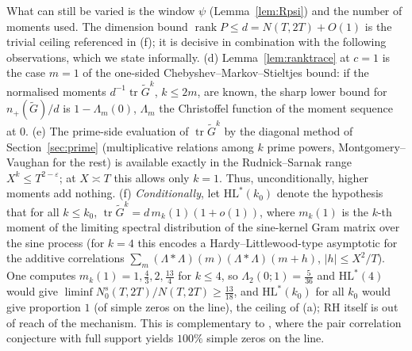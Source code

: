 \documentclass[11pt]{amsart}
\theoremstyle{definition}
\theoremstyle{remark}
\numberwithin{equation}{section}
\DeclareMathOperator{\tr}{tr}
\DeclareMathOperator{\rank}{rank}
\newcommand{\eps}{\varepsilon}
\newcommand{\Gt}{\widetilde{G}}
\newcommand{\npl}{n_{+}}
\begin{document}
What can still be varied is the window $\psi$ (Lemma~\ref{lem:Rpsi}) and the number of moments used. The dimension bound $\rank P\le d=N(T,2T)+O(1)$ is the trivial ceiling referenced in (f); it is decisive in combination with the following observations, which we state informally. (d) Lemma~\ref{lem:ranktrace} at $c=1$ is the case $m=1$ of the one-sided Chebyshev--Markov--Stieltjes bound: if the normalised moments $d^{-1}\tr\Gt^k$, $k\le2m$, are known, the sharp lower bound for $\npl(\Gt)/d$ is $1-\Lambda_m(0)$, $\Lambda_m$ the Christoffel function of the moment sequence at $0$. (e) The prime-side evaluation of $\tr\Gt^k$ by the diagonal method of Section~\ref{sec:prime} (multiplicative relations among $k$ prime powers, Montgomery--Vaughan for the rest) is available exactly in the Rudnick--Sarnak range \cite{RS96} $X^k\le T^{2-\eps}$; at $X\asymp T$ this allows only $k=1$. Thus, unconditionally, higher moments add nothing. (f) \emph{Conditionally}, let $\mathrm{HL}^*(k_0)$ denote the hypothesis that for all $k\le k_0$, $\tr\Gt^k=d\,m_k(1)(1+o(1))$, where $m_k(1)$ is the $k$-th moment of the limiting spectral distribution of the sine-kernel Gram matrix over the sine process (for $k=4$ this encodes a Hardy--Littlewood-type asymptotic for the additive correlations $\sum_m(\Lambda\!\ast\!\Lambda)(m)(\Lambda\!\ast\!\Lambda)(m+h)$, $|h|\le X^2/T$). One computes $m_k(1)=1,\tfrac43,2,\tfrac{13}4$ for $k\le4$, so $\Lambda_2(0;1)=\tfrac5{36}$ and $\mathrm{HL}^*(4)$ would give $\liminf N_0^{s}(T,2T)/N(T,2T)\ge\frac{13}{18}$, and $\mathrm{HL}^*(k_0)$ for all $k_0$ would give proportion $1$ (of simple zeros on the line), the ceiling of (a); RH itself is out of reach of the mechanism. This is complementary to \cite{GLSS25}, where the pair correlation conjecture with full support yields $100\%$ simple zeros on the line.
\end{document}
